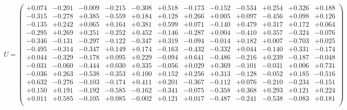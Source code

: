 \documentclass[9pt]{article}
\theoremstyle{plain}
\theoremstyle{definition}
\theoremstyle{remark}
\numberwithin{equation}{section}
\begin{document}
$U = \left(
\begin{array}{
cccccccccccc}
+0.074 & -0.201 & -0.009 & -0.215 & -0.308 & +0.518 & -0.173 & -0.152 & -0.534 & +0.254 & +0.326 & +0.188 \\
-0.315 & -0.278 & +0.385 & -0.559 & +0.184 & +0.128 & +0.266 & +0.005 & +0.097 & -0.456 & +0.098 & +0.126 \\
-0.135 & +0.242 & +0.065 & +0.164 & +0.381 & +0.599 & +0.071 & -0.140 & +0.479 & +0.317 & +0.172 & +0.064 \\
-0.295 & +0.269 & +0.251 & -0.252 & +0.452 & -0.146 & -0.287 & +0.004 & -0.410 & +0.357 & -0.324 & -0.076 \\
-0.346 & -0.131 & -0.297 & -0.122 & -0.347 & +0.319 & -0.094 & -0.014 & +0.182 & +0.007 & -0.703 & +0.025 \\
-0.495 & -0.314 & -0.347 & +0.149 & +0.174 & -0.163 & -0.432 & -0.332 & +0.044 & -0.140 & +0.331 & -0.174 \\
+0.044 & -0.329 & -0.178 & +0.095 & +0.229 & -0.094 & +0.641 & -0.486 & -0.216 & +0.239 & -0.187 & -0.048 \\
-0.031 & -0.060 & -0.444 & +0.030 & +0.335 & -0.056 & +0.029 & +0.369 & -0.101 & -0.031 & +0.006 & +0.731 \\
-0.036 & +0.263 & -0.538 & -0.353 & +0.100 & +0.152 & +0.256 & +0.313 & -0.128 & -0.052 & +0.185 & -0.516 \\
+0.632 & -0.276 & -0.103 & -0.174 & +0.411 & +0.201 & -0.367 & -0.112 & +0.076 & -0.210 & -0.234 & -0.151 \\
+0.150 & +0.191 & -0.192 & -0.585 & -0.162 & -0.341 & -0.075 & -0.358 & +0.368 & +0.293 & +0.121 & +0.224 \\
+0.011 & +0.585 & -0.105 & +0.085 & -0.002 & +0.121 & +0.017 & -0.487 & -0.241 & -0.538 & -0.083 & +0.181 \\
\end{array}
\right)$ \newline 
\end{document}
